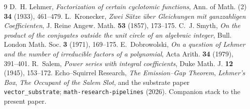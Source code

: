 \documentclass[11pt]{article}
\theoremstyle{plain}
\theoremstyle{definition}
\theoremstyle{remark}
\begin{document}
\begin{thebibliography}{9}
\small
{} D.~H. Lehmer, \emph{Factorization of certain cyclotomic functions}, Ann. of Math.
(2) \textbf{34} (1933), 461--479.
 L.~Kronecker, \emph{Zwei S\"atze \"uber Gleichungen mit ganzzahligen
Coefficienten}, J. Reine Angew. Math. \textbf{53} (1857), 173--175.
 C.~J. Smyth, \emph{On the product of the conjugates outside the unit circle of an
algebraic integer}, Bull. London Math. Soc. \textbf{3} (1971), 169--175.
 E.~Dobrowolski, \emph{On a question of Lehmer and the number of irreducible
factors of a polynomial}, Acta Arith. \textbf{34} (1979), 391--401.
 R.~Salem, \emph{Power series with integral coefficients}, Duke Math. J. \textbf{12}
(1945), 153--172.
 Echo--Squirrel Research, \emph{The Emission--Gap Theorem}, \emph{Lehmer's Box},
\emph{The Occupant of the Salem Slot}, and the substrate paper \texttt{vector\_substrate};
\texttt{math-research-pipelines} (2026). Companion stack to the present paper.
\end{thebibliography}
\end{document}
